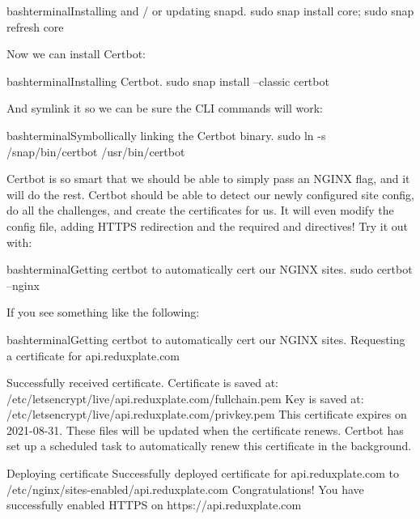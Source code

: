 \documentclass[a4paper,headinclude=on,footinclude=on,12pt,oneside]{scrbook}
\begin{document}
\begin{codeInput}{bash}{terminal}{Installing and / or updating snapd.}
sudo snap install core; sudo snap refresh core
\end{codeInput}

Now we can install Certbot:

\begin{codeInput}{bash}{terminal}{Installing Certbot.}
sudo snap install --classic certbot
\end{codeInput}

And symlink it so we can be sure the CLI commands will work:

\begin{codeInput}{bash}{terminal}{Symbollically linking the Certbot binary.}
sudo ln -s /snap/bin/certbot /usr/bin/certbot
\end{codeInput}

Certbot is so smart that we should be able to simply pass an NGINX flag, and it will do the rest. Certbot should be able to detect our newly configured  site config, do all the challenges, and create the certificates for us. It will even modify the  config file, adding HTTPS redirection and the required  and  directives! Try it out with:

\begin{codeInput}{bash}{terminal}{Getting certbot to automatically cert our NGINX sites.}
sudo certbot --nginx
\end{codeInput}

If you see something like the following:

\begin{codeInput}{bash}{terminal}{Getting certbot to automatically cert our NGINX sites.}
Requesting a certificate for api.reduxplate.com

Successfully received certificate.
Certificate is saved at: /etc/letsencrypt/live/api.reduxplate.com/fullchain.pem
Key is saved at:         /etc/letsencrypt/live/api.reduxplate.com/privkey.pem
This certificate expires on 2021-08-31.
These files will be updated when the certificate renews.
Certbot has set up a scheduled task to automatically renew this certificate in the background.

Deploying certificate
Successfully deployed certificate for api.reduxplate.com to /etc/nginx/sites-enabled/api.reduxplate.com
Congratulations! You have successfully enabled HTTPS on https://api.reduxplate.com
\end{codeInput}
\end{document}
